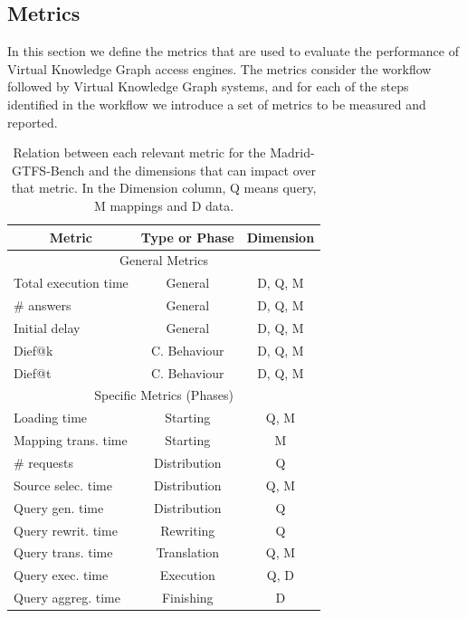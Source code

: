 \subsection{Metrics}
In this section we define the metrics that are used to evaluate the performance of Virtual Knowledge Graph access engines. The metrics consider the workflow followed by Virtual Knowledge Graph systems, and for each of the steps identified in the workflow we introduce a set of metrics to be measured and reported.
\begin{table}[]
\caption[Metrics VS dimensions]{Relation between each relevant metric for the Madrid-GTFS-Bench and the dimensions that can impact over that metric. In the Dimension column, Q means query, M mappings and D data.}
\label{tab:dimsensions}
\begin{tabular}{l|c|c}
\hline
\multicolumn{1}{c|}{\textbf{Metric}} & \textbf{Type or Phase} & \textbf{Dimension}  \\ \hline
\multicolumn{3}{c}{General Metrics}                                                 \\ \hline
Total execution time                & General                & D, Q, M \\ \hline
\# answers                            & General                & D, Q, M \\ \hline
Initial delay                         & General                & D, Q, M \\ \hline
Dief@k                                & C. Behaviour           & D, Q, M \\ \hline
Dief@t                                & C. Behaviour           & D, Q, M \\ \hline
\multicolumn{3}{c}{Specific Metrics (Phases)}                                       \\ \hline
Loading time                          & Starting        & Q, M      \\ \hline
Mapping trans. time              & Starting         & M              \\ \hline
\# requests                           & Distribution      & Q              \\ \hline
Source selec. time                 & Distribution      & Q, M     \\ \hline
Query gen. time                 & Distribution      & Q               \\ \hline
Query rewrit. time                  & Rewriting     & Q                \\ \hline
Query trans. time                & Translation    & Q, M       \\ \hline
Query exec. time                  & Execution     & Q, D          \\ \hline
Query aggreg. time                & Finishing         & D                 \\ \hline
\end{tabular}
\end{table}

